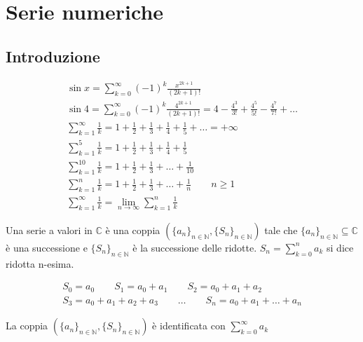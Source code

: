 \section{Serie numeriche} 
\subsection{Introduzione}

\begin{gather*}
	\sin x = \sum_{k=0}^{\infty} (-1)^{k} \frac{x^{2k+1}}{(2k+1)!}
	\\
	\sin 4 = \sum_{k=0}^{\infty} (-1)^{k} \frac{4^{2k+1}}{(2k+1)!} = 
	4 - \frac{4^3}{3!} + \frac{4^5}{5!} - \frac{4^7}{7!} + \ldots 
	\\
	\sum_{k=1}^{\infty} \frac{1}{k} = 1 + \frac{1}{2} + \frac{1}{3} + \frac{1}{4} + \frac{1}{5} + \ldots = +\infty
	\\
	\sum_{k=1}^{5} \frac{1}{k} = 1 + \frac{1}{2} + \frac{1}{3} + \frac{1}{4} + \frac{1}{5} 
	\\
	\sum_{k=1}^{10} \frac{1}{k} = 1 + \frac{1}{2} + \frac{1}{3} + \ldots + \frac{1}{10}
	\\
	\sum_{k=1}^n \frac{1}{k} = 1 + \frac{1}{2} + \frac{1}{3} + \ldots + \frac{1}{n} \qquad n \geq 1 
	\\
	\sum_{k=1}^{\infty} \frac{1}{k} = \lim_{n\rightarrow\infty} \sum_{k=1}^{n} \frac{1}{k} 
\end{gather*}


\begin{definition} 
	Una serie a valori in $\mathbb{C}$ è una coppia $(\{a_n\}_{n \in \mathbb{N}}, \{S_n\}_{n\in\mathbb{N}})$ tale che $\{a_n\}_{n\in\mathbb{N}} \subseteq \mathbb{C}$ è una successione e $\{S_n\}_{n\in\mathbb{N}}$ è la successione delle ridotte.
	$S_n=\sum_{k=0}^{n} a_k$ si dice ridotta n-esima.
\end{definition}


\begin{exbar} 
	\begin{gather*}
		S_0=a_0 \qquad S_1=a_0+a_1 \qquad	S_2=a_0+a_1+a_2 \\
		S_3=a_0+a_1+a_2+a_3 \qquad \ldots \qquad S_n=a_0+a_1+\ldots+a_n
	\end{gather*}
\end{exbar}

La coppia $(\{a_n\}_{n \in \mathbb{N}}, \{S_n\}_{n\in\mathbb{N}})$ è identificata con $\sum_{k=0}^{\infty} a_k$

